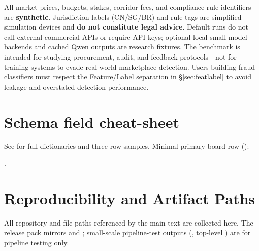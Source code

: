 \documentclass[sigconf,review]{acmart}
\begin{document}
All market prices, budgets, stakes, corridor fees, and compliance rule identifiers are \textbf{synthetic}. Jurisdiction labels (CN/SG/BR) and rule tags are simplified simulation devices and \textbf{do not constitute legal advice}. Default runs do not call external commercial APIs or require API keys; optional local small-model backends and cached Qwen outputs are research fixtures. The benchmark is intended for studying procurement, audit, and feedback protocols---not for training systems to evade real-world marketplace detection. Users building fraud classifiers must respect the Feature/Label separation in \S\ref{sec:featlabel} to avoid leakage and overstated detection performance.

\nocite{bester2001strategic,cumming2019capital}



\appendix

\section{Schema field cheat-sheet}
\label{app:schema}

See  for full dictionaries and three-row samples. Minimal primary-board row ():

.

\section{Reproducibility and Artifact Paths}
\label{app:repro}

All repository and file paths referenced by the main text are collected here. The release pack  mirrors  and ; small-scale pipeline-test outputs (, top-level ) are for pipeline testing only.
\end{document}

